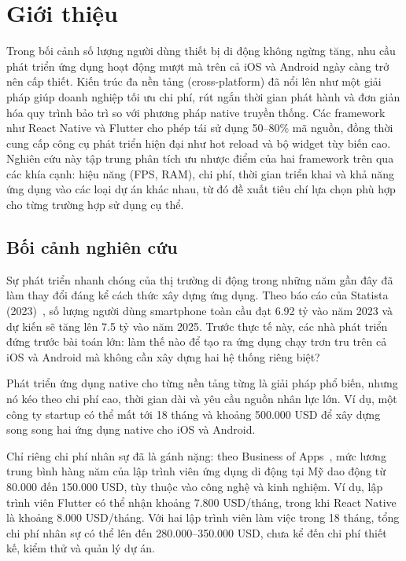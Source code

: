 \section{Giới thiệu}
  
    Trong bối cảnh số lượng người dùng thiết bị di động không ngừng tăng, nhu cầu phát triển ứng dụng hoạt động mượt mà trên cả iOS và Android ngày càng trở nên cấp thiết. Kiến trúc đa nền tảng (cross-platform) đã nổi lên như một giải pháp giúp doanh nghiệp tối ưu chi phí, rút ngắn thời gian phát hành và đơn giản hóa quy trình bảo trì so với phương pháp native truyền thống. Các framework như React Native và Flutter cho phép tái sử dụng 50--80\% mã nguồn, đồng thời cung cấp công cụ phát triển hiện đại như hot reload và bộ widget tùy biến cao. Nghiên cứu này tập trung phân tích ưu nhược điểm của hai framework trên qua các khía cạnh: hiệu năng (FPS, RAM), chi phí, thời gian triển khai và khả năng ứng dụng vào các loại dự án khác nhau, từ đó đề xuất tiêu chí lựa chọn phù hợp cho từng trường hợp sử dụng cụ thể.

\subsection{Bối cảnh nghiên cứu}
\renewcommand{\labelitemi}{--}    

    Sự phát triển nhanh chóng của thị trường di động trong những năm gần đây đã làm thay đổi đáng kể cách thức xây dựng ứng dụng. Theo báo cáo của Statista (2023)~\cite{statista2023}, số lượng người dùng smartphone toàn cầu đạt 6.92 tỷ vào năm 2023 và dự kiến sẽ tăng lên 7.5 tỷ vào năm 2025. Trước thực tế này, các nhà phát triển đứng trước bài toán lớn: làm thế nào để tạo ra ứng dụng chạy trơn tru trên cả iOS và Android mà không cần xây dựng hai hệ thống riêng biệt?
\vspace{0.5em}


    Phát triển ứng dụng native cho từng nền tảng từng là giải pháp phổ biến, nhưng nó kéo theo chi phí cao, thời gian dài và yêu cầu nguồn nhân lực lớn. Ví dụ, một công ty startup có thể mất tới 18 tháng và khoảng 500.000 USD để xây dựng song song hai ứng dụng native cho iOS và Android.
\vspace{0.5em}


    Chỉ riêng chi phí nhân sự đã là gánh nặng: theo Business of Apps~\cite{businessofapps2025}, mức lương trung bình hàng năm của lập trình viên ứng dụng di động tại Mỹ dao động từ 80.000 đến 150.000 USD, tùy thuộc vào công nghệ và kinh nghiệm. Ví dụ, lập trình viên Flutter có thể nhận khoảng 7.800 USD/tháng, trong khi React Native là khoảng 8.000 USD/tháng. Với hai lập trình viên làm việc trong 18 tháng, tổng chi phí nhân sự có thể lên đến 280.000--350.000 USD, chưa kể đến chi phí thiết kế, kiểm thử và quản lý dự án.
\vspace{0.5em}


